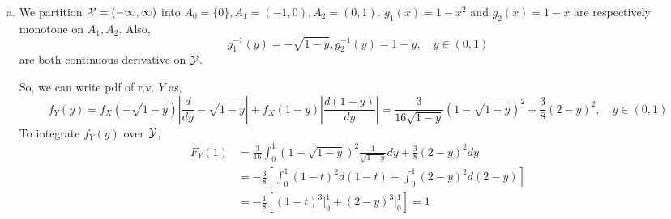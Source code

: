 \documentclass[letterpaper]{article}
\newcommand{\cX}{\cal{X}}
\newcommand{\cY}{\cal{Y}}
\begin{document}
\begin{enumerate}[(a)]
    \item We partition $\cX = (-1, 1)$ into 
    $A_0 = \{0\}, A_1 = (-1, 0), A_2 = (0,1)$. $g_1(x) = 1-x^2$ and 
    $g_2(x) = 1-x$ are respectively monotone on $A_1, A_2$. 
    Also,
    \[
    g^{-1}_1(y) = -\sqrt{1-y}, g^{-1}_2(y) = 1-y, \quad y \in (0,1)
    \]
    are both continuous derivative on $\cY$. 
    
    So, we can write pdf of r.v. $Y$ as,
    \[
    f_Y(y) = f_X(-\sqrt{1-y})\left|\frac{d}{dy} -\sqrt{1-y}\right|
    + f_X(1-y)\left|\frac{d(1-y)}{dy}\right| =
    \frac{3}{16\sqrt{1-y}}(1-\sqrt{1-y})^2 + \frac{3}{8}(2-y)^2, \quad y \in (0,1)
    \]
    To integrate $f_Y(y)$ over $\cY$,
    \begin{align*}
    F_Y(1) & = \frac{3}{16}\int_0^1 (1-\sqrt{1-y})^2\frac{1}{\sqrt{1-y}} dy 
    + \frac{3}{8} (2-y)^2 dy \\
    & = -\frac{3}{8} \left[\int_0^1 (1-t)^2 d(1-t) + \int_0^1 (2-y)^2
    d(2-y)\right] \\
    & = -\frac{1}{8} \left[ (1-t)^3 \rvert^1_0 + (2-y)^3\rvert^1_0\right]
    = 1
    \end{align*}
    \end{enumerate}
\end{document}
